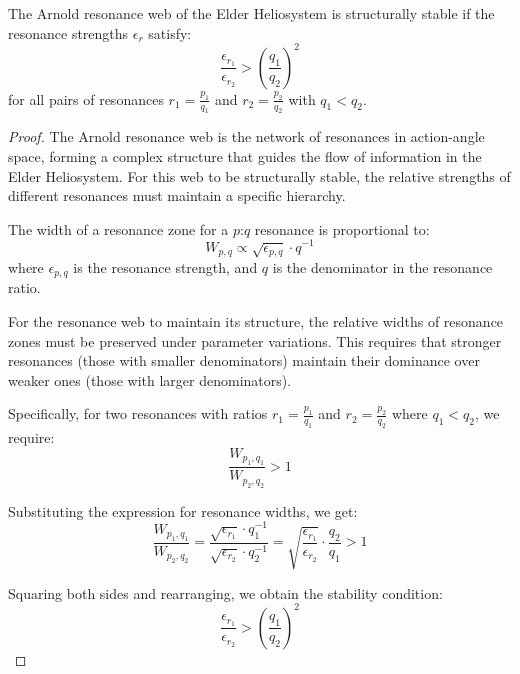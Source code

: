 \begin{theorem}
The Arnold resonance web of the Elder Heliosystem is structurally stable if the resonance strengths $\epsilon_r$ satisfy:
\begin{equation}
\frac{\epsilon_{r_1}}{\epsilon_{r_2}} > \left(\frac{q_1}{q_2}\right)^2
\end{equation}
for all pairs of resonances $r_1 = \frac{p_1}{q_1}$ and $r_2 = \frac{p_2}{q_2}$ with $q_1 < q_2$.
\end{theorem}

\begin{proof}
The Arnold resonance web is the network of resonances in action-angle space, forming a complex structure that guides the flow of information in the Elder Heliosystem. For this web to be structurally stable, the relative strengths of different resonances must maintain a specific hierarchy.

The width of a resonance zone for a $p$:$q$ resonance is proportional to:
\begin{equation}
W_{p,q} \propto \sqrt{\epsilon_{p,q}} \cdot q^{-1}
\end{equation}
where $\epsilon_{p,q}$ is the resonance strength, and $q$ is the denominator in the resonance ratio.

For the resonance web to maintain its structure, the relative widths of resonance zones must be preserved under parameter variations. This requires that stronger resonances (those with smaller denominators) maintain their dominance over weaker ones (those with larger denominators).

Specifically, for two resonances with ratios $r_1 = \frac{p_1}{q_1}$ and $r_2 = \frac{p_2}{q_2}$ where $q_1 < q_2$, we require:
\begin{equation}
\frac{W_{p_1,q_1}}{W_{p_2,q_2}} > 1
\end{equation}

Substituting the expression for resonance widths, we get:
\begin{equation}
\frac{W_{p_1,q_1}}{W_{p_2,q_2}} = \frac{\sqrt{\epsilon_{r_1}} \cdot q_1^{-1}}{\sqrt{\epsilon_{r_2}} \cdot q_2^{-1}} = \sqrt{\frac{\epsilon_{r_1}}{\epsilon_{r_2}}} \cdot \frac{q_2}{q_1} > 1
\end{equation}

Squaring both sides and rearranging, we obtain the stability condition:
\begin{equation}
\frac{\epsilon_{r_1}}{\epsilon_{r_2}} > \left(\frac{q_1}{q_2}\right)^2
\end{equation}


\end{proof}
